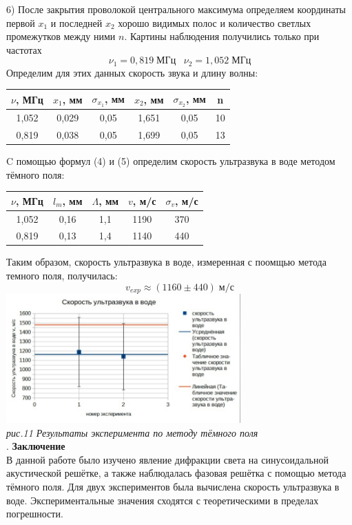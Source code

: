 \documentclass[a4paper]{article}
\begin{document}
\begin{multicols}{2}
\small
6) После закрытия проволокой центрального максимума определяем координаты первой $x_1$ и последней $x_2$ хорошо видимых полос и количество светлых промежутков между ними $n$.
Картины наблюдения получились только при частотах
$$\nu_1 = 0,819 \; \textit{МГц} \; \; \; \nu_2 = 1,052 \; \textit{МГц}$$
Определим для этих данных скорость звука и длину волны:
\begin{center}
\footnotesize
\begin{tabular}{|c|c|c|c|c|c|}
			\hline
			 $\nu$, МГц & $x_1$, мм & $\sigma_{x_1}$, мм & $x_2$, мм & $\sigma_{x_2}$, мм & n  \\ \hline
			 1,052 & 0,029 & 0,05 & 1,651 & 0,05 & 10  \\ \hline
			0,819 & 0,038 & 0,05 & 1,699 & 0,05 & 13  \\ \hline
		\end{tabular}
\end{center}
\small
C помощью формул (4) и (5) определим скорость ультразвука в воде методом тёмного поля:
\begin{center}
\begin{tabular}{|c|c|c|c|c|}
			\hline
			$\nu$, МГц & $l_m$, мм & $\Lambda$, мм &  $v$, м/с & $\sigma_{v}$, м/с  \\ \hline
			1,052 & 0,16  & 1,1  & 1190 & 370  \\ \hline
			0,819 & 0,13 & 1,4  & 1140 & 440  \\ \hline
		\end{tabular}
\end{center}
Таким образом, скорость ультразвука в воде, измеренная с поомщью метода темного поля, получилась:
$$v_{exp} \approx (1160 \pm 440) \; \textit{м/с}$$
\includegraphics[width=9cm]{g3}\\
\textit{рис.11 Результаты эксперимента по методу тёмного поля}\\
. \textbf{Заключение}\\
В данной работе было изучено явление дифракции света на синусоидальной акустической решётке, а также наблюдалась фазовая решётка с помощью метода тёмного поля. Для двух экспериментов была вычислена скорость ультразвука в воде. Экспериментальные значения сходятся с теоретическими в пределах погрешности.\\

\end{multicols}
\end{document}
